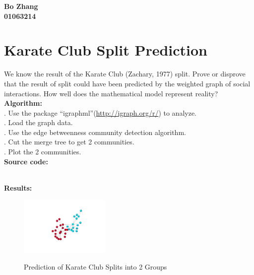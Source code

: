 \documentclass{article}
\begin{document}
		\begin{center}\textbf{Bo Zhang\\01063214}
		\end{center}
		\section{Karate Club Split Prediction}
		We know the result of the Karate Club (Zachary, 1977) split. Prove or disprove that the result of split could have been predicted by the weighted graph of social interactions. How well does the mathematical model represent reality?\\

		\noindent\textbf{Algorithm: }\\
		. Use the package ``igraphml''(\url{http://igraph.org/r/}) to analyze.\\
		. Load the graph data.\\
		. Use the edge betweenness community detection algorithm.\\
		. Cut the merge tree to get 2 communities.\\
		. Plot the 2 communities.\\

		\noindent\textbf{Source code:}
		

		\noindent\\\textbf{Results:}
		\begin{figure}[!htb]
			\centering 
			\href{https://github.com/zhangboroy/cs532-s17/blob/master/assg05_submission/group2.png}
			{\includegraphics[width=0.39\textwidth]{group2.png}}
			\label{fig:Prediction of Karate Club Splits into 2 Groups}
			\caption{Prediction of Karate Club Splits into 2 Groups}
		\end{figure}
\end{document}
